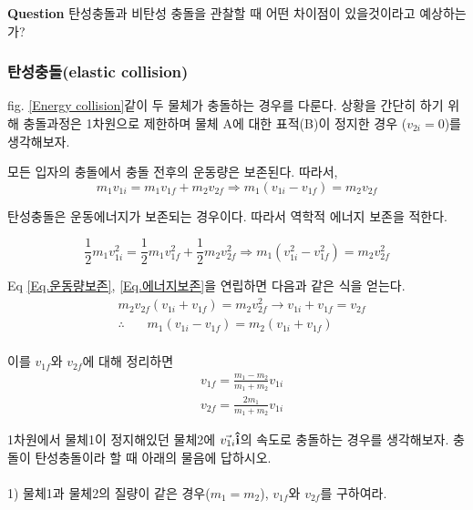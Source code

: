 \begin{flushleft}
{  \begin{flushleft}
   \textbf{Question} 탄성충돌과 비탄성 충돌을 관찰할 때 어떤 차이점이 있을것이라고 예상하는가?
  \end{flushleft}}


\subsubsection{탄성충돌(elastic collision)}
fig. \ref{Energy collision}\과 같이 두 물체가 충돌하는 경우를 다룬다.
상황을 간단히 하기 위해 충돌과정은 1차원으로 제한하며 물체 A에 대한 표적(B)이 정지한 경우 ($v_{2i}=0$)를 생각해보자. 


모든 입자의 충돌에서 충돌 전후의 운동량은 보존된다. 따라서, 
\begin{equation} \label{Eq.운동량보존}
  m_1v_{1i} =m_1v_{1f} +m_2v_{2f} \Rightarrow m_1(v_{1i}-v_{1f})=m_2 v_{2f}
\end{equation}

탄성충돌은 운동에너지가 보존되는 경우이다. 따라서 역학적 에너지 보존을 적한다.

\begin{equation} \label{Eq.에너지보존}
  \frac{1}{2} m_1v^2_{1i} =\frac{1}{2}m_1v^2_{1f} +\frac{1}{2}m_2v^2_{2f} 
  \Rightarrow m_1(v^2_{1i}-v^2_{1f})=m_2v^2_{2f}
\end{equation}



Eq \ref{Eq.운동량보존}, \ref{Eq.에너지보존}을 연립하면 다음과 같은 식을 얻는다. 
\[
\begin{split} 
   &m_2v_{2f}(v_{1i} +v_{1f})=m_2v^2_{2f} \rightarrow v_{1i}+v_{1f}=v_{2f}\\
   &\therefore \phantom{text} m_1(v_{1i}-v_{1f})=m_2(v_{1i}+v_{1f})\\
\end{split}
\]




이를 $v_{1f}$와 $v_{2f}$에 대해 정리하면 
\begin{align} 
   &v_{1f} =\frac{m_1-m_2}{m_1+m_2} v_{1i} \\
   &v_{2f}=\frac{2m_1}{m_1+m_2}v_{1i}  
\end{align}

\begin{task}[탄성충돌]
  \begin{flushleft}
  1차원에서 물체1이 정지해있던 물체2에 $\vec{v_{1i}}\vu{i}$의 속도로 충돌하는 경우를 생각해보자. 충돌이 탄성충돌이라 할 때 
  아래의 물음에 답하시오. \\
  \phantom{h}\\
  1) 물체1과 물체2의 질량이 같은 경우($m_1=m_2$), $v_{1f}$와 $v_{2f}$를 구하여라.\\
\indent


\end{flushleft}
\end{task}
\end{flushleft}

